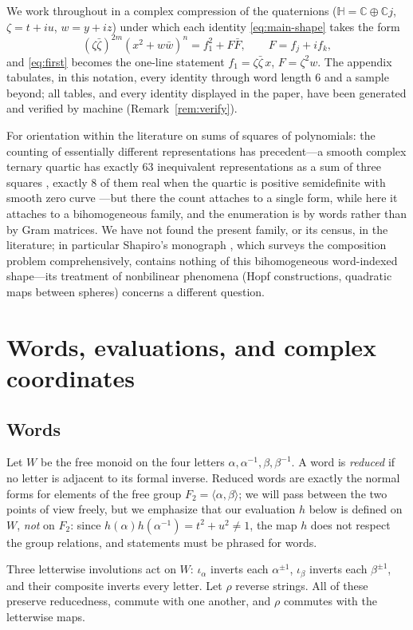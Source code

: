 \documentclass[11pt]{article}
\theoremstyle{definition}
\theoremstyle{remark}
\newcommand{\HH}{\mathbb{H}}
\newcommand{\CC}{\mathbb{C}}
\newcommand{\bz}{\bar{\zeta}}
\newcommand{\bw}{\bar{w}}
\newcommand{\ia}{\iota_\alpha}
\newcommand{\ib}{\iota_\beta}
\begin{document}
We work throughout in a complex compression of the quaternions ($\HH=\CC\oplus\CC j$, $\zeta=t+iu$, $w=y+iz$) under which each identity \eqref{eq:main-shape} takes the form
\[
(\zeta\bz)^{2m}(x^2+w\bw)^n=f_1^2+F\bar F,\qquad F=f_j+if_k,
\]
and \eqref{eq:first} becomes the one-line statement $f_1=\zeta\bz\,x$, $F=\zeta^2 w$. The appendix tabulates, in this notation, every identity through word length $6$ and a sample beyond; all tables, and every identity displayed in the paper, have been generated and verified by machine (Remark~\ref{rem:verify}).

For orientation within the literature on sums of squares of polynomials: the counting of essentially different representations has precedent---a smooth complex ternary quartic has exactly $63$ inequivalent representations as a sum of three squares \cite{PSV}, exactly $8$ of them real when the quartic is positive semidefinite with smooth zero curve \cite{PRSS}---but there the count attaches to a single form, while here it attaches to a bihomogeneous family, and the enumeration is by words rather than by Gram matrices. We have not found the present family, or its census, in the literature; in particular Shapiro's monograph \cite{ShapiroBook}, which surveys the composition problem comprehensively, contains nothing of this bihomogeneous word-indexed shape---its treatment of nonbilinear phenomena (Hopf constructions, quadratic maps between spheres) concerns a different question.

\section{Words, evaluations, and complex coordinates}\label{sec:setup}

\subsection{Words}
Let $W$ be the free monoid on the four letters $\alpha,\alpha^{-1},\beta,\beta^{-1}$. A word is \emph{reduced} if no letter is adjacent to its formal inverse. Reduced words are exactly the normal forms for elements of the free group $F_2=\langle\alpha,\beta\rangle$; we will pass between the two points of view freely, but we emphasize that our evaluation $h$ below is defined on $W$, \emph{not} on $F_2$: since $h(\alpha)h(\alpha^{-1})=t^2+u^2\ne1$, the map $h$ does not respect the group relations, and statements must be phrased for words.

Three letterwise involutions act on $W$: $\ia$ inverts each $\alpha^{\pm1}$, $\ib$ inverts each $\beta^{\pm1}$, and their composite inverts every letter. Let $\rho$ reverse strings. All of these preserve reducedness, commute with one another, and $\rho$ commutes with the letterwise maps.
\end{document}
